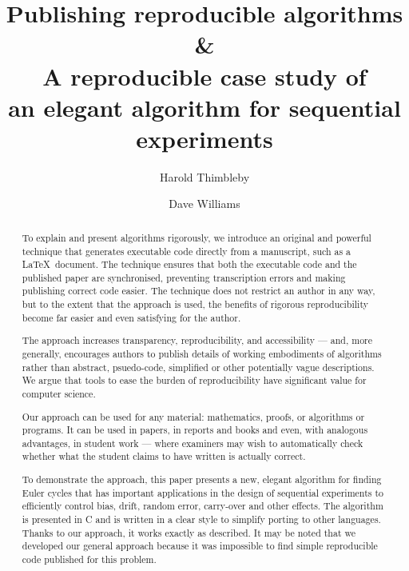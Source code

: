 \documentclass[preprint,times]{elsarticle}
\begin{document}
\title{Publishing reproducible algorithms\\
\&\\
A reproducible case study of \\an elegant algorithm 
for sequential experiments
}

\author[swansea]{Harold Thimbleby}

\author[swansea]{Dave Williams}

\address[swansea]{Swansea University, Wales, SA2 8PP}

\begin{abstract}
To explain and present algorithms rigorously, we introduce an original and powerful technique that generates executable code directly from a manuscript, such as a \LaTeX\ document. The technique ensures that both the executable code and the published paper are synchronised, preventing transcription errors and making publishing correct code easier. The technique does not restrict an author in any way, but to the extent that the approach is used, the benefits of rigorous reproducibility become far easier and even satisfying for the author. 

The approach increases transparency, reproducibility, and accessibility --- and, more generally, encourages authors to publish details of working embodiments of algorithms rather than abstract, psuedo-code, simplified or other potentially vague descriptions. We argue that tools to ease the burden of reproducibility have significant value for computer science.

Our approach can be used for any material: mathematics, proofs, or algorithms or programs. It can be used in papers, in reports and books and even, with analogous advantages, in student work --- where examiners may wish to automatically check whether what the student claims to have written is actually correct.

To demonstrate the approach, this paper presents a new, elegant algorithm for finding Euler cycles 
that has important applications in the design of sequential experiments to efficiently control bias, drift, random error, carry-over and other effects. The algorithm is presented in C and is written in a clear style to simplify porting to other languages. Thanks to our approach, it works exactly as described. It may be noted that we developed our general approach because it was impossible to find simple reproducible code published for this problem.
\end{abstract}
\end{document}
